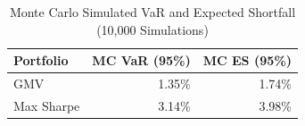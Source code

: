 \begin{table}[H]
\centering
\caption{\label{tab:mc_summary}Monte Carlo Simulated VaR and Expected Shortfall (10,000 Simulations)}
\fontsize{9}{11}\selectfont
\begin{tabular}[t]{lrr}
\toprule
Portfolio & MC VaR (95\%) & MC ES (95\%)\\
\midrule
GMV & 1.35\% & 1.74\%\\
Max Sharpe & 3.14\% & 3.98\%\\
\bottomrule
\end{tabular}
\end{table}
